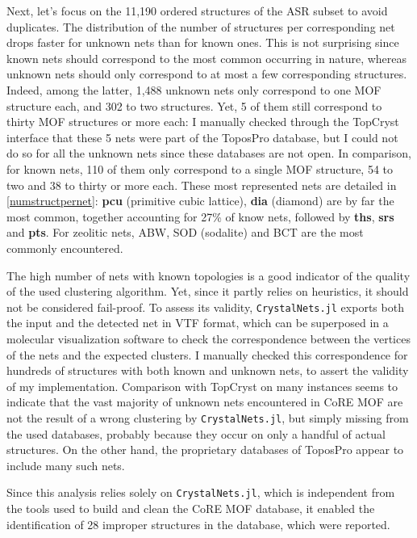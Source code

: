 \documentclass[main.tex]{subfiles}
\begin{document}
Next, let's focus on the 11,190 ordered structures of the ASR subset to avoid duplicates.
The distribution of the number of structures per corresponding net drops faster for unknown nets than for known ones. This is not surprising since known nets should correspond to the most common occurring in nature, whereas unknown nets should only correspond to at most a few corresponding structures. Indeed, among the latter, 1,488 unknown nets only correspond to one MOF structure each, and 302 to two structures. Yet, 5 of them still correspond to thirty MOF structures or more each: I manually checked through the TopCryst interface \autocite{TopCryst} that these 5 nets were part of the ToposPro database, but I could not do so for all the unknown nets since these databases are not open. In comparison, for known nets, 110 of them only correspond to a single MOF structure, 54 to two and 38 to thirty or more each. These most represented nets are detailed in \cref{numstructpernet}: \textbf{pcu} (primitive cubic lattice), \textbf{dia} (diamond) are by far the most common, together accounting for {27\%} of know nets, followed by \textbf{ths}, \textbf{srs} and \textbf{pts}. For zeolitic nets, ABW, SOD (sodalite) and BCT are the most commonly encountered.

The high number of nets with known topologies is a good indicator of the quality of the used clustering algorithm. Yet, since it partly relies on heuristics, it should not be considered fail-proof. To assess its validity, \texttt{CrystalNets.jl} exports both the input and the detected net in VTF format, which can be superposed in a molecular visualization software to check the correspondence between the vertices of the nets and the expected clusters. I manually checked this correspondence for hundreds of structures with both known and unknown nets, to assert the validity of my implementation. Comparison with TopCryst on many instances seems to indicate that the vast majority of unknown nets encountered in CoRE MOF are not the result of a wrong clustering by \texttt{CrystalNets.jl}, but simply missing from the used databases, probably because they occur on only a handful of actual structures. On the other hand, the proprietary databases of ToposPro appear to include many such nets.

Since this analysis relies solely on \texttt{CrystalNets.jl}, which is independent from the tools used to build and clean the CoRE MOF database, it enabled the identification of 28 improper structures in the database, which were reported.
\end{document}
